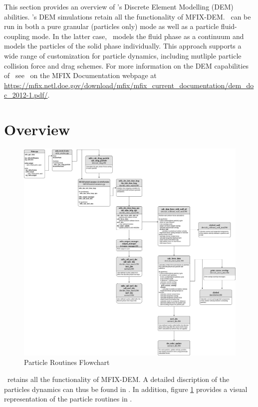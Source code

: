 This section provides an overview of \mfix's Discrete Element Modelling (DEM)
abilities. \mfix's DEM simulations retain all the functionality of MFIX-DEM. 
\mfix\ can be run in both a pure granular (particles only) mode  
as well as a particle fluid-coupling mode. In the latter case, \mfix\ models 
the fluid phase as a continuum and models the
particles of the solid phase individually. This approach supports a wide range 
of customization for particle dynamics, including mutliple particle collision 
force and drag schemes. For more information on the DEM capabilities of \mfix\
see \demdoc\ on the MFIX Documentation webpage at  
{\url{https://mfix.netl.doe.gov/download/mfix/mfix_current_documentation/dem_doc_2012-1.pdf/}}.  

\section{Overview}

\begin{figure}
    \includegraphics[width=\linewidth,natwidth=800, natheight=600]{./Particles/MFIX-Particle-Diagram.png} 
    \caption{Particle Routines Flowchart}
    \label{fig:pflowchart}
\end{figure}

\mfix\ retains all the functionality of MFIX-DEM. A detailed discription of the
particles dynamics can thus be found in \demdoc.
In addition, figure \ref{fig:pflowchart} provides a visual representation
of the particle routines in \mfix. 

